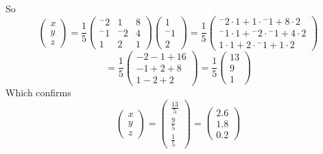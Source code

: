 \documentclass{article}
\begin{document}
\begin{enumerate}
\begin{enumerate}[i.]
So
\[
	\left(
		\begin{array}{c}
			x \\
			y \\
			z
		\end{array}
	\right)
	=
	\frac{1}{5}
	\left(
		\begin{array}{ccc}
			{^-}2 &        1 & 8 \\
			{^-}1 & {^-}2 & 4 \\
			1        &         2 & 1
		\end{array}	
	\right)
	\left(
		\begin{array}{c}
			       1 \\
			{^-}1 \\
			       2
		\end{array}
	\right)
	=
	\frac{1}{5}
	\left(
		\begin{array}{c}
			 {^-}2 \cdot 1 +        1 \cdot {^-}1 +  8 \cdot2 \\
			 {^-}1 \cdot 1 + {^-}2 \cdot {^-}1 +  4 \cdot 2 \\
			         1 \cdot 1 +        2 \cdot {^-}1 +  1 \cdot 2
		\end{array}
	\right)
\]
\[
	=
	\frac{1}{5}
	\left(
		\begin{array}{c}
			 -2 - 1 +16 \\
			 -1 + 2 + 8 \\
			 1 - 2 + 2
		\end{array}
	\right)
	=
	\frac{1}{5}
	\left(
		\begin{array}{c}
			 13 \\
			 9 \\
			 1
		\end{array}
	\right)
\]
Which confirms
\[
	\left(
		\begin{array}{c}
			x \\
			y \\
			z
		\end{array}
	\right)
	=
	\left(
		\begin{array}{c}
			\frac{13}{5} \\
			\frac{9}{5} \\
			\frac{1}{5}
		\end{array}
	\right)
	=
	\left(
		\begin{array}{c}
			2.6 \\
			1.8 \\
			0.2
		\end{array}
	\right)
\]
\\

\end{enumerate}

\end{enumerate}
\end{document}
